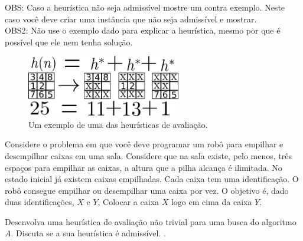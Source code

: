 \documentclass[12pt]{exam}
\begin{document}
\begin{questions}
OBS: Caso a heurística não seja admissível mostre um contra exemplo. Neste caso você deve criar uma instância que não seja admissível e mostrar.\\
OBS2: Não use o exemplo dado para explicar a heurística, mesmo por que é possível que ele nem tenha solução.



\begin{figure}[h]
    \centering
    \includegraphics[width=0.60\textwidth]{8p3heu}
    \caption{Um exemplo de uma das heurísticas de avaliação.}
    \label{fig:8p3heu}
\end{figure}


\question Considere o problema em que você deve programar um robô para empilhar e desempilhar caixas em uma sala. Considere que na sala existe, pelo menos, três espaços para empilhar as caixas, a altura que a pilha alcança é ilimitada. No estado inicial já existem caixas empilhadas. Cada caixa tem uma identificação. O robô consegue empilhar ou desempilhar uma caixa por vez. O objetivo é, dado duas identificações, $X$ e $Y$, Colocar a caixa $X$ logo em cima da caixa $Y$.

Desenvolva uma heurística de avaliação não trivial para uma busca do algoritmo $A$. Discuta se a sua heurística é admissível.
.


\end{questions}
\end{document}
